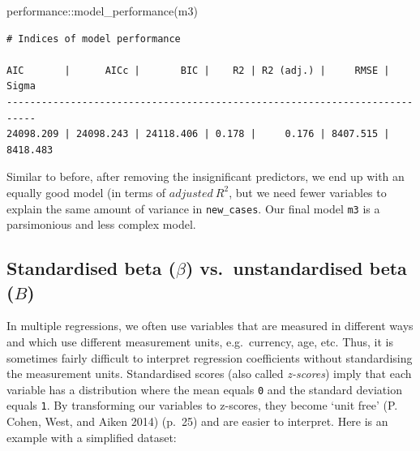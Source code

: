 \documentclass[
  letterpaper,
]{krantz}
\makeatletter
\newenvironment{Shaded}{\begin{snugshade}}{\end{snugshade}}
\newcommand{\FunctionTok}[1]{\textcolor[rgb]{0.28,0.35,0.67}{#1}}
\newcommand{\NormalTok}[1]{\textcolor[rgb]{0.00,0.23,0.31}{#1}}
\newcommand{\SpecialCharTok}[1]{\textcolor[rgb]{0.37,0.37,0.37}{#1}}
\newenvironment{kframe}{%
\medskip{}
\setlength{\fboxsep}{.8em}
 \def\at@end@of@kframe{}%
 \ifinner\ifhmode%
  \def\at@end@of@kframe{\end{minipage}}%
  \begin{minipage}{\columnwidth}%
 \fi\fi%
 \def\FrameCommand##1{\hskip\@totalleftmargin \hskip-\fboxsep
 \colorbox{shadecolor}{##1}\hskip-\fboxsep
     \hskip-\linewidth \hskip-\@totalleftmargin \hskip\columnwidth}%
 \MakeFramed {\advance\hsize-\width
   \@totalleftmargin\z@ \linewidth\hsize
   \@setminipage}}%
 {\par\unskip\endMakeFramed%
 \at@end@of@kframe}
\renewenvironment{Shaded}{\begin{kframe}}{\end{kframe}}
\makeatother
\begin{document}
\begin{Shaded}
\begin{Highlighting}[]
\NormalTok{performance}\SpecialCharTok{::}\FunctionTok{model\_performance}\NormalTok{(m3)}
\end{Highlighting}
\end{Shaded}

\begin{verbatim}
# Indices of model performance

AIC       |      AICc |       BIC |    R2 | R2 (adj.) |     RMSE |    Sigma
---------------------------------------------------------------------------
24098.209 | 24098.243 | 24118.406 | 0.178 |     0.176 | 8407.515 | 8418.483
\end{verbatim}

Similar to before, after removing the insignificant predictors, we end
up with an equally good model (in terms of \(adjusted\ R^2\), but we
need fewer variables to explain the same amount of variance in
\texttt{new\_cases}. Our final model \texttt{m3} is a parsimonious and
less complex model.

\subsection{\texorpdfstring{Standardised beta (\(\beta\))
vs.~unstandardised beta
(\(B\))}{Standardised beta (\textbackslash beta) vs.~unstandardised beta (B)}}\label{sec-standardised-beta-vs-unstandardised-beta}

In multiple regressions, we often use variables that are measured in
different ways and which use different measurement units, e.g.~currency,
age, etc. Thus, it is sometimes fairly difficult to interpret regression
coefficients without standardising the measurement units. Standardised
scores (also called \emph{z-scores}) imply that each variable has a
distribution where the mean equals \texttt{0} and the standard deviation
equals \texttt{1}. By transforming our variables to z-scores, they
become `unit free' (P. Cohen, West, and Aiken 2014) (p.~25) and are
easier to interpret. Here is an example with a simplified dataset:
\end{document}
